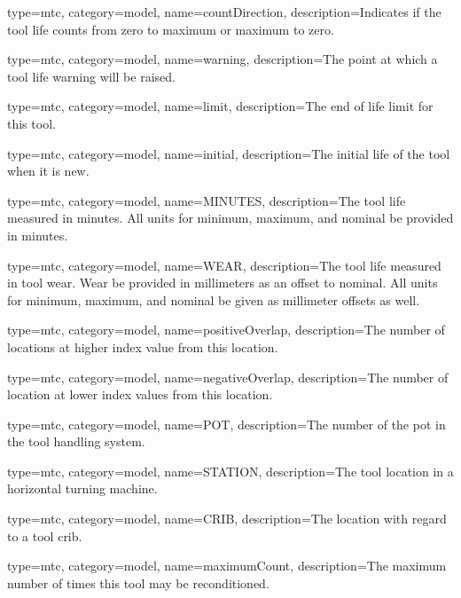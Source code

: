 {
  type=mtc,
  category=model,
  name={countDirection},
  description={Indicates if the tool life counts from zero to maximum or maximum to zero.}
}


{
  type=mtc,
  category=model,
  name={warning},
  description={The point at which a tool life warning will be raised.}
}


{
  type=mtc,
  category=model,
  name={limit},
  description={The end of life limit for this tool.}
}


{
  type=mtc,
  category=model,
  name={initial},
  description={The initial life of the tool when it is new.}
}


{
  type=mtc,
  category=model,
  name={MINUTES},
  description={The tool life measured in minutes. All units for minimum, maximum, and nominal \MUST be provided in minutes.}
}


{
  type=mtc,
  category=model,
  name={WEAR},
  description={The tool life measured in tool wear. Wear \MUST be provided in millimeters as an offset to nominal. All units for minimum, maximum, and nominal \MUST be given as millimeter offsets as well. }
}



{
  type=mtc,
  category=model,
  name={positiveOverlap},
  description={The number of locations at higher index value from this location.}
}


{
  type=mtc,
  category=model,
  name={negativeOverlap},
  description={The number of location at lower index values from this location.}
}


{
  type=mtc,
  category=model,
  name={POT},
  description={The number of the pot in the tool handling system.}
}


{
  type=mtc,
  category=model,
  name={STATION},
  description={The tool location in a horizontal turning machine.}
}


{
  type=mtc,
  category=model,
  name={CRIB},
  description={The location with regard to a tool crib.}
}


{
  type=mtc,
  category=model,
  name={maximumCount},
  description={The maximum number of times this tool may be reconditioned.}
}



